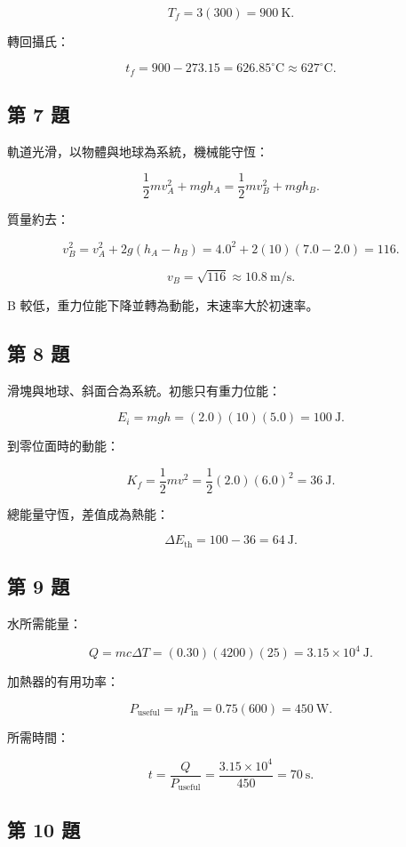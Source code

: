 \documentclass[11pt,a4paper]{article}
\begin{document}
\[
T_f=3(300)=900\ \mathrm K.
\]

轉回攝氏：

\[
t_f=900-273.15=626.85^\circ\mathrm C
\approx627^\circ\mathrm C.
\]

\subsection{第 7 題}\label{ux7b2c-7-ux984c}

軌道光滑，以物體與地球為系統，機械能守恆：

\[
\frac12mv_A^2+mgh_A
=\frac12mv_B^2+mgh_B.
\]

質量約去：

\[
v_B^2=v_A^2+2g(h_A-h_B)
=4.0^2+2(10)(7.0-2.0)=116.
\]

\[
v_B=\sqrt{116}\approx10.8\ \mathrm{m/s}.
\]

B 較低，重力位能下降並轉為動能，末速率大於初速率。

\subsection{第 8 題}\label{ux7b2c-8-ux984c}

滑塊與地球、斜面合為系統。初態只有重力位能：

\[
E_i=mgh=(2.0)(10)(5.0)=100\ \mathrm J.
\]

到零位面時的動能：

\[
K_f=\frac12mv^2=\frac12(2.0)(6.0)^2=36\ \mathrm J.
\]

總能量守恆，差值成為熱能：

\[
\Delta E_{\mathrm{th}}=100-36=64\ \mathrm J.
\]

\subsection{第 9 題}\label{ux7b2c-9-ux984c}

水所需能量：

\[
Q=mc\Delta T=(0.30)(4200)(25)=3.15\times10^4\ \mathrm J.
\]

加熱器的有用功率：

\[
P_{\mathrm{useful}}=\eta P_{\mathrm{in}}=0.75(600)=450\ \mathrm W.
\]

所需時間：

\[
t=\frac{Q}{P_{\mathrm{useful}}}
=\frac{3.15\times10^4}{450}=70\ \mathrm s.
\]

\subsection{第 10 題}\label{ux7b2c-10-ux984c}
\end{document}
